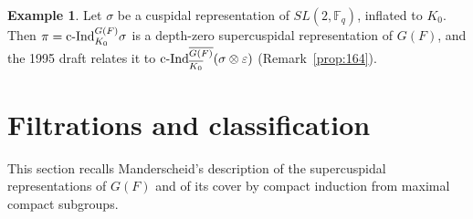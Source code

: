 \documentclass[12pt,letterpaper,openany]{book}
\theoremstyle{plain}
\theoremstyle{definition}
\newtheorem{example}[theorem]{Example}
\theoremstyle{remark}
\theoremstyle{remark}
\begin{document}
\begin{example}
Let $\sigma$ be a cuspidal representation of $SL(2,{\mathbb F}_q)$, inflated to
$K_0$. Then $\pi={\rm c\text{-}Ind}_{K_0}^{G(F)}\sigma$ is a depth-zero
supercuspidal representation of $G(F)$, and the 1995 draft relates it to
${\rm c\text{-}Ind}_{\overline{K_0}}^{\overline{G(F)}}(\sigma\otimes\varepsilon)$
(Remark~\ref{prop:164}).
\end{example}

\section{Filtrations and classification}\label{sec:filtrations}

This section recalls Manderscheid's description of the supercuspidal representations of $G(F)$ and of its cover by compact induction from maximal compact subgroups.
\end{document}
